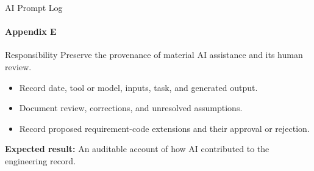 \begin{frame}{AI Prompt Log}
\framesubtitle{Appendix E}
\begin{block}{Responsibility}
Preserve the provenance of material AI assistance and its human review.
\end{block}
\begin{itemize}
  \item Record date, tool or model, inputs, task, and generated output.
  \item Document review, corrections, and unresolved assumptions.
  \item Record proposed requirement-code extensions and their approval or rejection.
\end{itemize}
\vspace{0.15cm}
\textbf{Expected result:} An auditable account of how AI contributed to the engineering record.
\end{frame}
